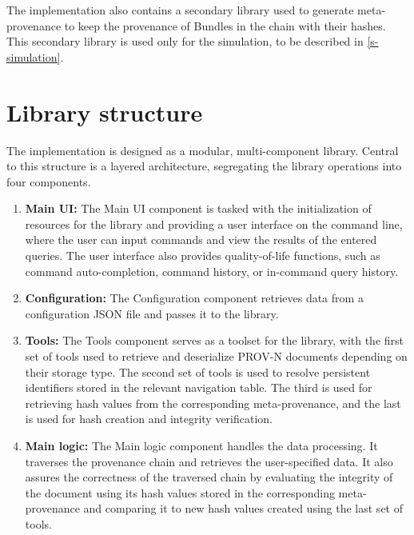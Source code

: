 \documentclass[
  digital,     %
  oneside,     %
  nosansbold,  %
  nocolorbold, %
  lof,         %
  lot,         %
]{fithesis4}
\begin{document}
The implementation also contains a secondary library used to generate meta-provenance to keep the provenance of Bundles in the chain with their hashes. This secondary library is used only for the simulation, to be described in \ref{s-simulation}.

\section{Library structure}
\shorthandoff{-}
The implementation is designed as a modular, multi-component library. Central to this structure is a layered architecture, segregating the library operations into four components.

\begin{enumerate}
    \item \textbf{Main UI:}
        The Main UI component is tasked with the initialization of resources for the library and providing a user interface on the command line, where the user can input commands and view the results of the entered queries. The user interface also provides quality-of-life functions, such as command auto-completion, command history, or in-command query history.
    \item \textbf{Configuration:}
        The Configuration component retrieves data from a configuration JSON file and passes it to the library.
    \item \textbf{Tools:}
        The Tools component serves as a toolset for the library, with the first set of tools used to retrieve and deserialize PROV-N documents depending on their storage type. The second set of tools is used to resolve persistent identifiers stored in the relevant navigation table. The third is used for retrieving hash values from the corresponding meta-provenance, and the last is used for hash creation and integrity verification.
    \item \textbf{Main logic:}
        The Main logic component handles the data processing. It traverses the provenance chain and retrieves the user-specified data. It also assures the correctness of the traversed chain by evaluating the integrity of the document using its hash values stored in the corresponding meta-provenance and comparing it to new hash values created using the last set of tools.
\end{enumerate}
\shorthandon{-}
\end{document}
